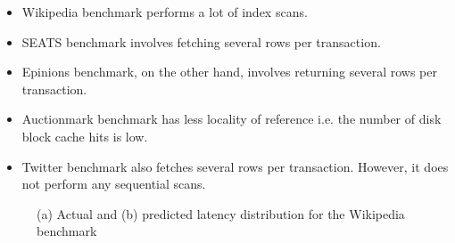 \begin{itemize}
  \item Wikipedia benchmark performs a lot of index scans.
  \item SEATS benchmark involves fetching several rows per transaction.
  \item Epinions benchmark, on the other hand, involves returning several rows
  per transaction.
  \item Auctionmark benchmark has less locality of reference i.e. the number of
  disk block cache hits is low.
  \item Twitter benchmark also fetches several rows per transaction. However, it
  does not perform any sequential scans.\\
\end{itemize}

\begin{figure}
\centering
{}

\caption{(a) Actual and (b) predicted latency distribution for the
  Wikipedia benchmark}
\label{fig:latency_wikipedia}
\end{figure}

